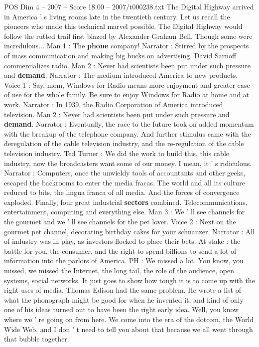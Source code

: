 \begin{textsample}{POS Dim 4 – 2007 – Score 18.00 – 2007/t000238.txt}
The Digital Highway arrived in America ' s living rooms late in the twentieth century.
Let us recall the pioneers who made this technical marvel possible.
The Digital Highway would follow the rutted trail first blazed by Alexander Graham Bell.
Though some were incredulous...
Man 1 : The \textbf{phone} company!
Narrator : Stirred by the prospects of mass communication and making big bucks on advertising, David Sarnoff commercializes radio.
Man 2 : Never had scientists been put under such pressure and \textbf{demand}.
Narrator : The medium introduced America to new products.
Voice 1 : Say, mom, Windows for Radio means more enjoyment and greater ease of use for the whole family.
Be sure to enjoy Windows for Radio at home and at work.
Narrator : In 1939, the Radio Corporation of America introduced television.
Man 2 : Never had scientists been put under such pressure and \textbf{demand}.
Narrator : Eventually, the race to the future took on added momentum with the breakup of the telephone company.
And further stimulus came with the deregulation of the cable television industry, and the re-regulation of the cable television industry.
Ted Turner : We did the work to build this, this cable industry, now the broadcasters want some of our money.
I mean, it ' s ridiculous.
Narrator : Computers, once the unwieldy tools of accountants and other geeks, escaped the backrooms to enter the media fracas.
The world and all its culture reduced to bits, the lingua franca of all media.
And the forces of convergence exploded.
Finally, four great industrial \textbf{sectors} combined.
Telecommunications, entertainment, computing and everything else.
Man 3 : We ' ll see channels for the gourmet and we ' ll see channels for the pet lover.
Voice 2 : Next on the gourmet pet channel, decorating birthday cakes for your schnauzer.
Narrator : All of industry was in play, as investors flocked to place their bets.
At stake : the battle for you, the consumer, and the right to spend billions to send a lot of information into the parlors of America.
PH : We missed a lot.
You know, you missed, we missed the Internet, the long tail, the role of the audience, open systems, social networks.
It just goes to show how tough it is to come up with the right uses of media.
Thomas Edison had the same problem.
He wrote a list of what the phonograph might be good for when he invented it, and kind of only one of his ideas turned out to have been the right early idea.
Well, you know where we ' re going on from here.
We come into the era of the dotcom, the World Wide Web, and I don ' t need to tell you about that because we all went through that bubble together.

\end{textsample}

